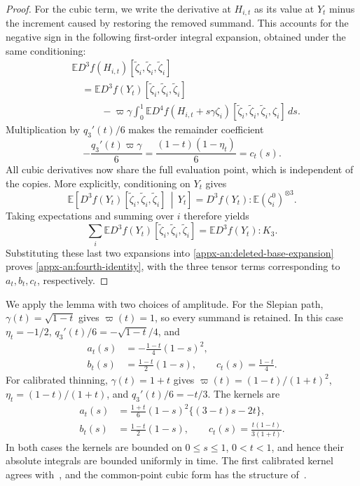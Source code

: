 \documentclass[11pt,letterpaper]{article}
\theoremstyle{remark}
\newcommand{\E}{\mathbb E}
\newcommand{\dd}{\,d}
\begin{document}
\begin{proof}
For the cubic term, we write the derivative at $H_{i,t}$ as its
value at $Y_t$ minus the increment caused by restoring the removed
summand. This accounts for the negative sign in the following
first-order integral expansion, obtained under the same conditioning:
\[
 \begin{aligned}
 &\E D^3f(H_{i,t})
       [\widetilde\zeta_i,\widetilde\zeta_i,\widetilde\zeta_i]\\
 &\quad=\E D^3f(Y_t)
       [\widetilde\zeta_i,\widetilde\zeta_i,\widetilde\zeta_i]\\
 &\qquad\quad-\varpi\gamma\int_0^1
       \E D^4f(H_{i,t}+s\gamma\zeta_i)
       [\widetilde\zeta_i,\widetilde\zeta_i,
        \widetilde\zeta_i,\zeta_i]\dd s.
 \end{aligned}
\]
Multiplication by \(q_3'(t)/6\) makes the remainder coefficient
\[
 -\frac{q_3'(t)\varpi\gamma}{6}
 =\frac{(1-t)(1-\eta_t)}6=c_t(s).
\]
All cubic derivatives now share the full evaluation point, which
is independent of the copies. More explicitly, conditioning on
$Y_t$ gives
\[
 \E\!\left[
 D^3f(Y_t)[\widetilde\zeta_i,\widetilde\zeta_i,\widetilde\zeta_i]
 \,\middle|\,Y_t\right]
 =D^3f(Y_t):\E(\zeta_i^0)^{\otimes3}.
\]
Taking expectations and summing over $i$ therefore yields
\[
 \sum_i\E D^3f(Y_t)
       [\widetilde\zeta_i,\widetilde\zeta_i,\widetilde\zeta_i]
 =\E D^3f(Y_t):K_3.
\]
Substituting these last two expansions into
\eqref{appx-an:deleted-base-expansion} proves
\eqref{appx-an:fourth-identity}, with the three tensor terms
corresponding to \(a_t,b_t,c_t\), respectively.
\end{proof}

We apply the lemma with two choices of amplitude. For the Slepian
path, \(\gamma(t)=\sqrt{1-t}\) gives \(\varpi(t)=1\),
so every summand is retained. In this case
\(\eta_t=-1/2\), \(q_3'(t)/6=-\sqrt{1-t}/4\), and
\[
 \begin{aligned}
 a_t(s)&=-\frac{1-t}{4}(1-s)^2,\\
 b_t(s)&=\frac{1-t}{2}(1-s),\qquad
 c_t(s)=\frac{1-t}{4}.
 \end{aligned}
\]
For calibrated thinning, \(\gamma(t)=1+t\) gives
\(\varpi(t)=(1-t)/(1+t)^2\),
\(\eta_t=(1-t)/(1+t)\), and \(q_3'(t)/6=-t/3\). The kernels are
\[
 \begin{aligned}
 a_t(s)&=\frac{1+t}{6}(1-s)^2\{(3-t)s-2t\},\\
 b_t(s)&=\frac{1-t}{2}(1-s),\qquad
 c_t(s)=\frac{t(1-t)}{3(1+t)}.
 \end{aligned}
\]
In both cases the kernels are bounded on
\(0\le s\le1\), \(0<t<1\), and hence their absolute integrals
are bounded uniformly in time.
The first calibrated kernel agrees with~\cite[Lemma~4.1]{AL}, and
the common-point cubic form has the structure
of~\cite[Lemma~22]{GaoZhang}.
\end{document}
